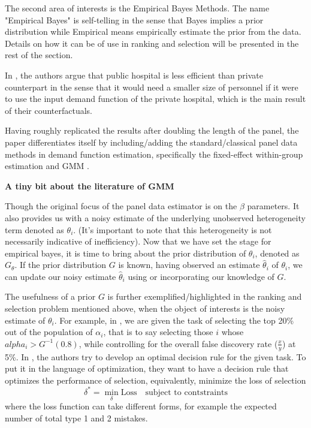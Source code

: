\documentclass[12pt]{article}
\begin{document}
The second area of interests is the Empirical Bayes Methods. The name
"Empirical Bayes" is self-telling in the sense that Bayes implies a prior
distribution while Empirical means empirically estimate the prior from the
data. Details on how it can be of use in ranking and selection will be
presented in the rest of the section.

In \cite{}, the authors argue that public hospital is less efficient than
private counterpart in the sense that it would need a smaller size of personnel
if it were to use the input demand function of the private hospital, which is
the main result of their counterfactuals.

Having roughly replicated the results after doubling the length of the panel,
the paper differentiates itself by including/adding the standard/classical
panel data methods in demand function estimation, specifically the fixed-effect
within-group estimation and GMM \cite{}.

\textbf{A tiny bit about the literature of GMM}

Though the original focus of the panel data estimator is on the $\beta$
parameters. It also provides us with a noisy estimate of the underlying
unobserved heterogeneity term denoted as $\theta_i$. (It's important to note
that this heterogeneity is not necessarily indicative of inefficiency). Now
that we have set the stage for empirical bayes, it is time to bring about the
prior distribution of $\theta_i$, denoted as $G_{\theta}$. If the prior
distribution $G$ is known, having observed an estimate $\hat{\theta}_i$ of
$\theta_i$, we can update our noisy estimate $\hat{\theta}_i$ using or
incorporating our knowledge of $G$.

The usefulness of a prior $G$ is further exemplified/highlighted in the ranking
and selection problem mentioned above, when the object of interests is the
noisy estimate of $\theta_i$. For example, in \cite{}, we are given the task of
selecting the top 20\% out of the population of $\alpha_i$, that is to say
selecting those $i$ whose $alpha_i>G^{-1}(0.8)$, while controlling for the
overall false discovery rate ($\frac{x}{y}$) at 5\%. In \cite{}, the authors
try to develop an optimal decision rule for the given task. To put it in the
language of optimization, they want to have a decision rule that optimizes the
performance of selection, equivalently, minimize the loss of selection
\begin{equation*}
    \delta^* = \min_{\delta} \text{Loss} \quad \text{subject to contstraints}
\end{equation*}
where the loss function can take different forms, for example the
expected number of total type 1 and 2 mistakes.
\end{document}
